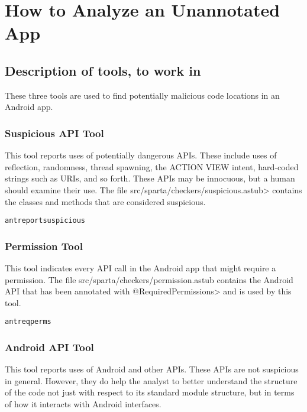 \htmlhr
\chapter{How to Analyze an Unannotated App\label{analyze-unannotated-app}}

\section{Description of tools, to work in}

These three tools are used to find potentially malicious code
 locations in an Android app.


\subsection{Suspicious API Tool\label{sec:suspicioustool}}

This tool reports uses of potentially dangerous APIs. These include uses of reflection, randomness, thread spawning, the ACTION VIEW intent, hard-coded strings such as URIs, and so forth. These APIs may be innocuous, but a human should examine their use.  The file \<src/sparta/checkers/suspicious.astub> contains the classes and methods that are considered suspicious.
 
\begin{alltt}
ant reportsuspicious
\end{alltt}

\subsection{Permission Tool\label{sec:permtool}}
  
This tool indicates every API call in the Android app that might require a permission.  The file src/sparta/checkers/permission.astub contains the Android API that has been annotated with \<@RequiredPermissions> and is used by this tool.

 \begin{alltt}
ant reqperms
\end{alltt}


\subsection{Android API Tool\label{sec:generaltool}}

This tool reports uses of Android and other APIs. These APIs are not suspicious in general. However, they do help the analyst to better understand the structure of the code not just with respect to its standard module structure, but in terms of how it interacts with Android interfaces. 


